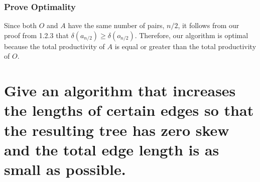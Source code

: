 \documentclass[11pt]{scrartcl}
\begin{document}
	\subsubsection{
		Prove Optimality
	}
	Since both $O$ and $A$ have the same number of pairs, $n/2$, it follows from our proof
	from 1.2.3 that $\delta(a_{n/2}) \geq \delta(o_{n/2})$. Therefore, our algorithm is
	optimal because
	the total productivity of $A$ is equal or greater than the total productivity of
	$O$.

	\section{
	  Give an algorithm that increases the lengths of certain edges so that
	  the resulting tree has zero skew and the total edge length is as small as
	  possible.
	 }
\end{document}
